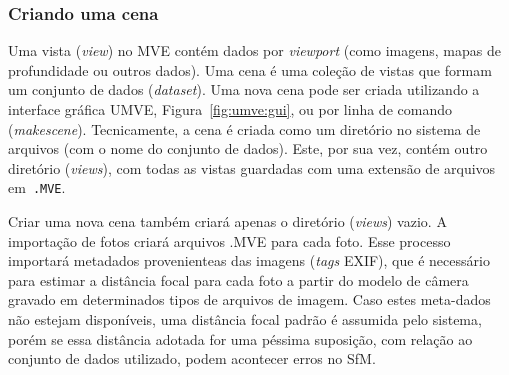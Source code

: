 \subsubsection{Criando uma cena}

Uma vista (\emph{view}) no MVE contém dados por \emph{viewport} (como imagens,
mapas de profundidade ou outros dados). Uma cena é uma coleção de vistas que
formam um conjunto de dados (\emph{dataset}). Uma nova cena pode ser criada
utilizando a interface gráfica UMVE, Figura~\ref{fig:umve:gui}, ou por linha de
comando (\emph{makescene}).  Tecnicamente, a cena é criada como um diretório no
sistema de arquivos (com o nome do conjunto de dados). Este, por sua vez, contém
outro diretório (\emph{views}), com todas as vistas guardadas com uma extensão
de arquivos em\ \texttt{.MVE}.

Criar uma nova cena também criará apenas o diretório (\emph{views}) vazio. A
importação de fotos criará arquivos .MVE para cada foto. Esse processo importará
metadados provenienteas das imagens (\emph{tags} EXIF), que é necessário para
estimar a distância focal para cada foto a partir do modelo de câmera gravado em
determinados tipos de arquivos de imagem. Caso estes meta-dados não estejam
disponíveis, uma distância focal padrão é assumida pelo sistema, porém se essa
distância adotada for uma péssima suposição, com relação ao conjunto de dados
utilizado, podem acontecer erros no SfM.

\newpage

